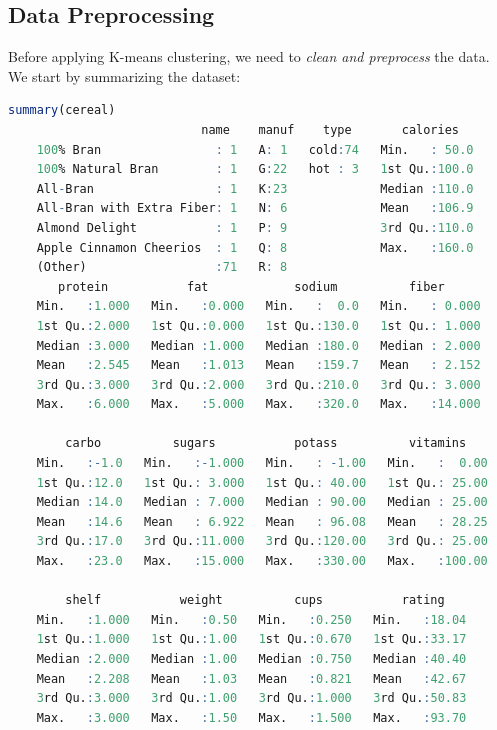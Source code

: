 \documentclass[
  11pt,
]{book}
\theoremstyle{definition}
\theoremstyle{definition}
\theoremstyle{definition}
\theoremstyle{definition}
\theoremstyle{remark}
\begin{document}
\subsection{Data Preprocessing}\label{data-preprocessing}

Before applying K-means clustering, we need to \emph{clean and preprocess} the data. We start by summarizing the dataset:

\begin{lstlisting}[language=R]
summary(cereal)
                           name    manuf    type       calories    
    100% Bran                : 1   A: 1   cold:74   Min.   : 50.0  
    100% Natural Bran        : 1   G:22   hot : 3   1st Qu.:100.0  
    All-Bran                 : 1   K:23             Median :110.0  
    All-Bran with Extra Fiber: 1   N: 6             Mean   :106.9  
    Almond Delight           : 1   P: 9             3rd Qu.:110.0  
    Apple Cinnamon Cheerios  : 1   Q: 8             Max.   :160.0  
    (Other)                  :71   R: 8                            
       protein           fat            sodium          fiber       
    Min.   :1.000   Min.   :0.000   Min.   :  0.0   Min.   : 0.000  
    1st Qu.:2.000   1st Qu.:0.000   1st Qu.:130.0   1st Qu.: 1.000  
    Median :3.000   Median :1.000   Median :180.0   Median : 2.000  
    Mean   :2.545   Mean   :1.013   Mean   :159.7   Mean   : 2.152  
    3rd Qu.:3.000   3rd Qu.:2.000   3rd Qu.:210.0   3rd Qu.: 3.000  
    Max.   :6.000   Max.   :5.000   Max.   :320.0   Max.   :14.000  
                                                                    
        carbo          sugars           potass          vitamins     
    Min.   :-1.0   Min.   :-1.000   Min.   : -1.00   Min.   :  0.00  
    1st Qu.:12.0   1st Qu.: 3.000   1st Qu.: 40.00   1st Qu.: 25.00  
    Median :14.0   Median : 7.000   Median : 90.00   Median : 25.00  
    Mean   :14.6   Mean   : 6.922   Mean   : 96.08   Mean   : 28.25  
    3rd Qu.:17.0   3rd Qu.:11.000   3rd Qu.:120.00   3rd Qu.: 25.00  
    Max.   :23.0   Max.   :15.000   Max.   :330.00   Max.   :100.00  
                                                                     
        shelf           weight          cups           rating     
    Min.   :1.000   Min.   :0.50   Min.   :0.250   Min.   :18.04  
    1st Qu.:1.000   1st Qu.:1.00   1st Qu.:0.670   1st Qu.:33.17  
    Median :2.000   Median :1.00   Median :0.750   Median :40.40  
    Mean   :2.208   Mean   :1.03   Mean   :0.821   Mean   :42.67  
    3rd Qu.:3.000   3rd Qu.:1.00   3rd Qu.:1.000   3rd Qu.:50.83  
    Max.   :3.000   Max.   :1.50   Max.   :1.500   Max.   :93.70  
   
\end{lstlisting}
\end{document}
